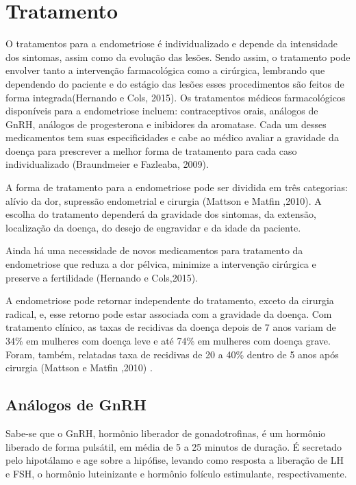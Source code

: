 \documentclass[12pt]{article} %
\begin{document}
\section{Tratamento} 

O tratamentos para a endometriose é individualizado e depende da
intensidade dos sintomas, assim como da evolução das lesões. Sendo
assim, o tratamento pode envolver tanto a intervenção farmacológica
como a cirúrgica, lembrando que dependendo do paciente e do estágio
das lesões esses procedimentos são feitos de forma integrada(Hernando
e Cols, 2015). Os tratamentos médicos farmacológicos disponíveis para
a endometriose incluem: contraceptivos orais, análogos de GnRH,
análogos de progesterona e inibidores da aromatase. Cada um desses
medicamentos tem suas especificidades e cabe ao médico avaliar a
gravidade da doença para prescrever a melhor forma de tratamento para
cada caso individualizado (Braundmeier e Fazleaba, 2009).

A forma de tratamento para a endometriose pode ser dividida em três
categorias: alívio da dor, supressão endometrial e cirurgia (Mattson e
Matfin ,2010). A escolha do tratamento dependerá da gravidade dos
sintomas, da extensão, localização da doença, do desejo de engravidar
e da idade da paciente.

Ainda há uma necessidade de novos medicamentos para tratamento da
endometriose que reduza a dor pélvica, minimize a intervenção
cirúrgica e preserve a fertilidade (Hernando e Cols,2015).

A endometriose pode retornar independente do tratamento, exceto da
cirurgia radical, e, esse retorno pode estar associada com a gravidade
da doença. Com tratamento clínico, as taxas de recidivas da doença
depois de 7 anos variam de 34\% em mulheres com doença leve e até 74\%
em mulheres com doença grave. Foram, também, relatadas taxa de
recidivas de 20 a 40\% dentro de 5 anos após cirurgia (Mattson e
Matfin ,2010) .

\subsection{Análogos de GnRH}

Sabe-se que o GnRH, hormônio liberador de gonadotrofinas, é um
hormônio liberado de forma pulsátil, em média de 5 a 25 minutos de
duração. É secretado pelo hipotálamo e age sobre a hipófise, levando
como resposta a liberação de LH e FSH, o hormônio luteinizante e
hormônio folículo estimulante, respectivamente.
\end{document}

